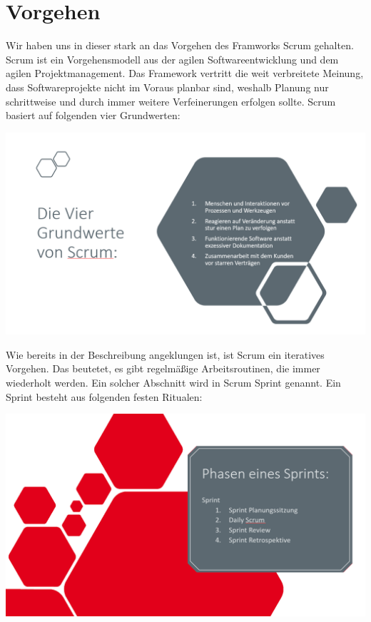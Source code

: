 \section{Vorgehen}
Wir haben uns in dieser stark an das Vorgehen des Framworks Scrum gehalten. Scrum ist ein Vorgehensmodell aus der agilen Softwareentwicklung und dem agilen Projektmanagement. Das Framework vertritt die weit verbreitete Meinung, dass Softwareprojekte nicht im Voraus planbar sind, weshalb Planung nur schrittweise und durch immer weitere Verfeinerungen erfolgen sollte. Scrum basiert auf folgenden vier Grundwerten:
\begin{center}
	\includegraphics[width=14cm, keepaspectratio]{img/4Scrum} 
\end{center}

Wie bereits in der Beschreibung angeklungen ist, ist Scrum ein iteratives Vorgehen. Das beutetet, es gibt regelmäßige Arbeitsroutinen, die immer wiederholt werden. Ein solcher Abschnitt wird in Scrum Sprint genannt. Ein Sprint besteht aus folgenden festen Ritualen:
\begin{center}
	\includegraphics[width=14cm, keepaspectratio]{img/5Scrum} 
\end{center}



